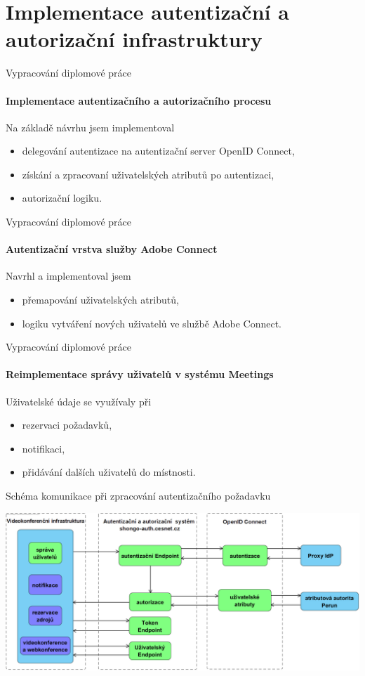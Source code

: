 \documentclass[
]{beamer}
\begin{document}
\section[Implementace autentizační a autorizační infrastruktury]{Implementace autentizační a autorizační infrastruktury}

\begin{frame}{Vypracování diplomové práce}
\framesubtitle{Implementace autentizačního a autorizačního procesu}

Na základě návrhu jsem implementoval
\begin{itemize}
     \item delegování autentizace na autentizační server OpenID Connect,
    \item  získání a zpracovaní uživatelských atributů po autentizaci,
    \item  autorizační logiku.
\end{itemize}

\end{frame}

\begin{frame}{Vypracování diplomové práce}
\framesubtitle{Autentizační vrstva služby Adobe Connect}
Navrhl a implementoval jsem
\begin{itemize}
    \item přemapování uživatelských atributů,
    \item logiku vytváření nových uživatelů ve službě Adobe Connect.
\end{itemize}
\end{frame}


\begin{frame}{Vypracování diplomové práce}
\framesubtitle{Reimplementace správy uživatelů v systému Meetings}

Uživatelské údaje se využívaly při
\begin{itemize}
    \item rezervaci požadavků,
    \item notifikaci,
    \item přidávání dalších uživatelů do místnosti. 
\end{itemize}
\end{frame}


\begin{frame}{Schéma komunikace při zpracování autentizačního požadavku}

\includegraphics[width=\textwidth]{pics/oidc-new.png}
\end{frame}
\end{document}
